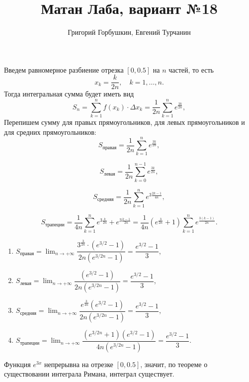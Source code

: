 \documentclass{report}
\title{\Huge{Матан Лаба, вариант №18}}
\author{\huge{Григорий Горбушкин, Евгений Турчанин}}
\date{}
\begin{document}
\maketitle

\noindent Введем равномерное разбиение отрезка $[0, 0.5]$ на $n$ частей, то есть
\begin{equation}
    x_k = \frac{k}{2n}, \quad k = 1, \ldots, n.
\end{equation}
Тогда интегральная сумма будет иметь вид
\begin{equation}
    S_n = \sum_{k=1}^{n} f(x_k) \cdot \Delta x_k = \frac{1}{2n} \sum_{k=1}^{n} e^{\frac{3k}{2n}},
\end{equation}
Перепишем сумму для правых прямоугольников, для левых прямоугольников и для средних прямоугольников:
\begin{equation}
    S_\text{правая} = \frac{1}{2n} \sum_{k=1}^{n} e^{\frac{3k}{2n}},
\end{equation}

\begin{equation}
    S_{\text{левая}} = \frac{1}{2n} \sum_{k=0}^{n-1} e^{\frac{3k}{2n}},
\end{equation}

\begin{equation}
    S_{\text{средняя}} = \frac{1}{2n} \sum_{k=1}^{n} e^{3\frac{2k-1}{4n}},
\end{equation}

\begin{equation}
    S_{\text{трапеции}} = \frac{1}{4n} \sum_{k=1}^{n} e^{3\frac{k}{2n}}+e^{3\frac{k-1}{2n}} =
    \frac{1}{4n}\left(e^{\frac{3}{2n}}+1 \right)\sum_{k=1}^{n} e^{\frac{3(k-1)}{2n}}.
\end{equation}


\begin{enumerate}
    \item $S_{\text{правая}} = \displaystyle\lim_ {n \to +\infty} \dfrac{3^{\frac{3}{2n}}\cdot(e^{3/2}-1)}{2n(e^{3/2n}-1)} = \dfrac{e^{3/2}-1}{3}$,
    \item $S_{\text{левая}} = \displaystyle\lim_ {n \to +\infty} \dfrac{(e^{3/2}-1)}{2n(e^{3/2n}-1)} = \dfrac{e^{3/2}-1}{3}$,
    \item $S_{\text{средняя}} = \displaystyle\lim_ {n \to +\infty} \dfrac{e^{\frac{3}{4n}}(e^{3/2}-1)}{2n(e^{3/2n}-1)} = \dfrac{e^{3/2}-1}{3}$,
    \item $S_{\text{трапеции}} = \displaystyle\lim_ {n \to +\infty} \dfrac{(e^{3/2n}+1)(e^{3/2}-1)}{4n(e^{3/2n}-1)} = \dfrac{e^{3/2}-1}{3}$.

\end{enumerate}
\noindent Функция $e^{3x}$ непрерывна на отрезке $[0, 0.5]$, значит, по теореме о существовании интеграла Римана, интеграл существует.
\end{document}
